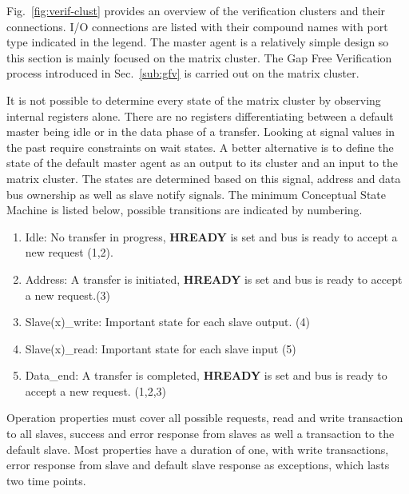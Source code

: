Fig.~\ref{fig:verif-clust} provides an overview of the verification clusters and their connections. I/O connections are listed with their compound names with port type indicated in the legend. The master agent is a relatively simple design so this section is mainly focused on the matrix cluster. The Gap Free Verification process introduced in Sec.~\ref{sub:gfv} is carried out on the matrix cluster. \par
It is not possible to determine every state of the matrix cluster by observing internal registers alone. There are no registers differentiating between a default master being idle or in the data phase of a transfer. Looking at signal values in the past require constraints on wait states. A better alternative is to define the state of the default master agent as an output to its cluster and an input to the matrix cluster. The states are determined based on this signal, address and data bus ownership as well as slave notify signals. The minimum Conceptual State Machine is listed below, possible transitions are indicated by numbering.  
\begin{enumerate}
 \item Idle: No transfer in progress, \textbf{HREADY} is set and bus is ready to accept a new request (1,2).
 \item Address: A transfer is initiated, \textbf{HREADY} is set and bus is ready to accept a new request.(3)
 \item Slave(x)\_write: Important state for each slave output. (4)
 \item Slave(x)\_read: Important state for each slave input (5)
 \item Data\_end: A transfer is completed, \textbf{HREADY} is set and bus is ready to accept a new request. (1,2,3) 
\end{enumerate}

Operation properties must cover all possible requests, read and write transaction to all slaves, success and error response from slaves as well a transaction to the default slave. Most properties have a duration of one, with write transactions, error response from slave and default slave response as exceptions, which lasts two time points. 

